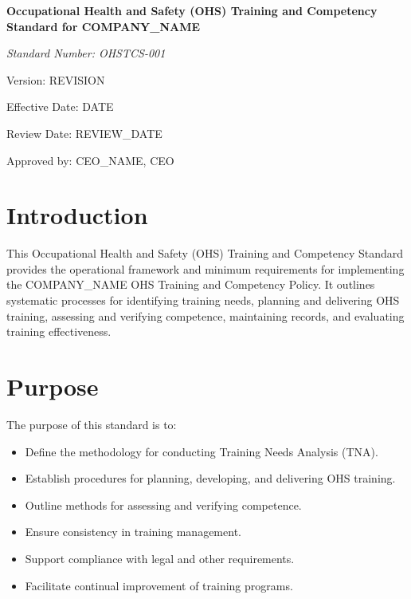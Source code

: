 \documentclass[12pt]{article}
\begin{document}
\begin{titlepage}
    \centering
    \vspace*{2cm}
    {\LARGE\bfseries Occupational Health and Safety (OHS) Training and Competency Standard for {{COMPANY_NAME}}\par}
    \vspace{1cm}
    {\large\itshape Standard Number: OHSTCS-001\par}
    \vspace{0.5cm}
    {\normalsize Version: {{REVISION}}\par}
    \vspace{0.5cm}
    {\normalsize Effective Date: {{DATE}}\par}
    \vspace{0.5cm}
    {\normalsize Review Date: {{REVIEW_DATE}}\par}
    \vspace{2cm}
    {\normalsize Approved by: {{CEO_NAME}}, CEO\par}
\end{titlepage}

\section{Introduction}
This Occupational Health and Safety (OHS) Training and Competency Standard provides the operational framework and minimum requirements for implementing the {{COMPANY_NAME}} OHS Training and Competency Policy. It outlines systematic processes for identifying training needs, planning and delivering OHS training, assessing and verifying competence, maintaining records, and evaluating training effectiveness.

\section{Purpose}
The purpose of this standard is to:
\begin{itemize}
    \item Define the methodology for conducting Training Needs Analysis (TNA).
    \item Establish procedures for planning, developing, and delivering OHS training.
    \item Outline methods for assessing and verifying competence.
    \item Ensure consistency in training management.
    \item Support compliance with legal and other requirements.
    \item Facilitate continual improvement of training programs.
\end{itemize}
\end{document}
